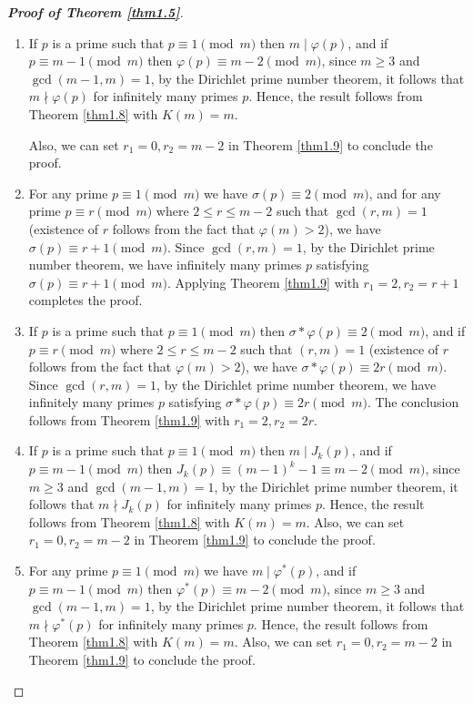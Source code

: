 \documentclass[12pt,reqno]{amsart}
\begin{document}
\begin{proof}[\textbf{Proof of Theorem \ref{thm1.5}}]\noindent
\begin{enumerate}
    \item If $p$ is a prime such that $p\equiv 1\pmod{m}$ then $m\mid \varphi(p)$, and if $p\equiv m-1\pmod{m}$ then $\varphi(p)\equiv m-2\pmod{m}$, since $m\geq3$ and $\gcd(m-1,m)=1$, by the Dirichlet prime number theorem, it follows that $m\nmid\varphi(p)$ for infinitely many primes $p$. Hence, the result follows from Theorem \ref{thm1.8} with $K(m)=m$.

Also, we can set $r_1=0,r_2=m-2$ in Theorem \ref{thm1.9} to conclude the proof.

\item For any prime $p\equiv 1\pmod{m}$ we have $\sigma(p)\equiv2\pmod{m}$, and for any prime $p\equiv r \pmod{m}$ where $2\leq r\leq m-2$ such that $\gcd(r,m)=1$ (existence of $r$ follows from the fact that $\varphi(m)>2$), we have $\sigma(p)\equiv r+1\pmod{m}$. Since $\gcd(r,m)=1$, by the Dirichlet prime number theorem, we have infinitely many primes $p$ satisfying $\sigma(p)\equiv r+1\pmod{m}$. Applying Theorem \ref{thm1.9} with $r_1=2,r_2=r+1$ completes the proof.
\item If $p$ is a prime such that $p\equiv 1\pmod{m}$ then $\sigma*\varphi(p) \equiv2\pmod{m}$, and if $p\equiv r \pmod{m}$ where $2\leq r\leq m-2$ such that $(r,m)=1$ (existence of $r$ follows from the fact that $\varphi(m)>2$), we have $\sigma*\varphi(p)\equiv 2r\pmod{m}$. Since $\gcd(r,m)=1$, by the Dirichlet prime number theorem, we have infinitely many primes $p$ satisfying $\sigma*\varphi(p)\equiv 2r\pmod{m}$. The conclusion follows from Theorem \ref{thm1.9} with $r_1=2,r_2=2r$.

\item If $p$ is a prime such that $p\equiv 1\pmod{m}$ then $m\mid J_k(p)$, and if $p\equiv m-1\pmod{m}$ then $J_k(p)\equiv (m-1)^k-1\equiv m-2 \pmod{m}$, since $m\geq3$ and $\gcd(m-1,m)=1$, by the Dirichlet prime number theorem, it follows that $m\nmid J_k(p)$ for infinitely many primes $p$. Hence, the result follows from Theorem \ref{thm1.8} with $K(m)=m$.
Also, we can set $r_1=0,r_2=m-2$ in Theorem \ref{thm1.9} to conclude the proof.
\item For any prime $p\equiv 1\pmod{m}$ we have $m\mid \varphi^{*}(p)$, and if $p\equiv m-1\pmod{m}$ then $\varphi^{*}(p)\equiv m-2 \pmod{m}$, since $m\geq3$ and $\gcd(m-1,m)=1$, by the Dirichlet prime number theorem, it follows that $m\nmid \varphi^{*}(p)$ for infinitely many primes $p$. Hence, the result follows from Theorem \ref{thm1.8} with $K(m)=m$.
Also, we can set $r_1=0,r_2=m-2$ in Theorem \ref{thm1.9} to conclude the proof.
\end{enumerate}
\end{proof}
\end{document}
